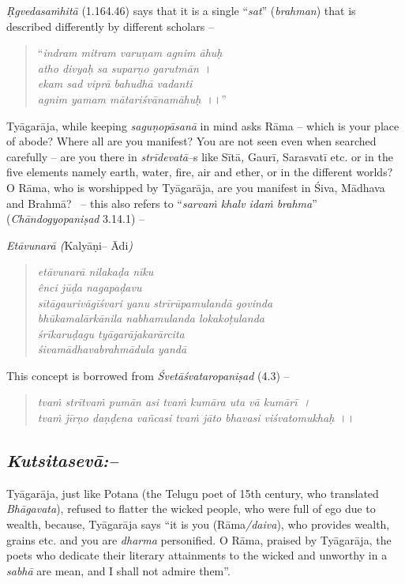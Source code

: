 \textit{Ṛgvedasaṁhitā} (1.164.46) says that it is a single “\textit{sat}” (\textit{brahman}) that is described differently by different scholars –

\begin{verse}
“\textit{indram mitram varuṇam agnim āhuḥ}\\\textit{atho divyaḥ sa suparṇo garutmān}~।\\\textit{ekam sad viprā bahudhā vadanti}\\\textit{agnim yamam mātariśvānamāhuḥ}~।।”
\end{verse}

Tyāgarāja, while keeping \textit{saguṇopāsanā} in mind asks Rāma – which is your place of abode? Where all are you manifest? You are not seen even when searched carefully – are you there in \textit{strīdevatā}–s like Sītā\textit{,} Gaurī\textit{,} Sarasvatī etc. or in the five elements namely earth, water, fire, air and ether, or in the different worlds? O Rāma, who is worshipped by Tyāgarāja, are you manifest in Śiva, Mādhava and Brahmā?  – this also refers to “\textit{sarvaṁ khalv idaṁ brahma}” (\textit{Chāndogyopaniṣad} 3.14.1) – 

\textit{Etāvunarā (}Kalyāṇi– Ādi\textit{)}

\begin{verse}
\textit{etāvunarā nilakaḍa nīku}\\\textit{ênci jūḍa nagapaḍavu}\\\textit{sītāgaurivāgīśvari yanu strīrūpamulandā govinda}\\\textit{bhūkamalārkānila nabhamulanda lokakoṭulanda}\\\textit{śrīkaruḍagu tyāgarājakarārcita}\\\textit{śivamādhavabrahmādula yandā}
\end{verse}

This concept is borrowed from \textit{Śvetāśvataropaniṣad} (4.3) –

\begin{verse}
\textit{tvaṁ strītvaṁ pumān asi tvaṁ kumāra uta vā kumārī~।}\\\textit{tvaṁ jīrṇo daṇḍena vañcasi tvaṁ jāto bhavasi viśvatomukhaḥ}~।।
\end{verse}


\subsection*{\textit{Kutsitasevā:–}}

Tyāgarāja, just like Potana (the Telugu poet of 15th century, who translated \textit{Bhāgavata}), refused to flatter the wicked people, who were full of ego due to wealth, because, Tyāgarāja says “it is you (Rāma\textit{/daiva}), who provides wealth, grains etc. and you are \textit{dharma} personified. O Rāma, praised by Tyāgarāja, the poets who dedicate their literary attainments to the wicked and unworthy in a \textit{sabhā} are mean, and I shall not admire them”. 

